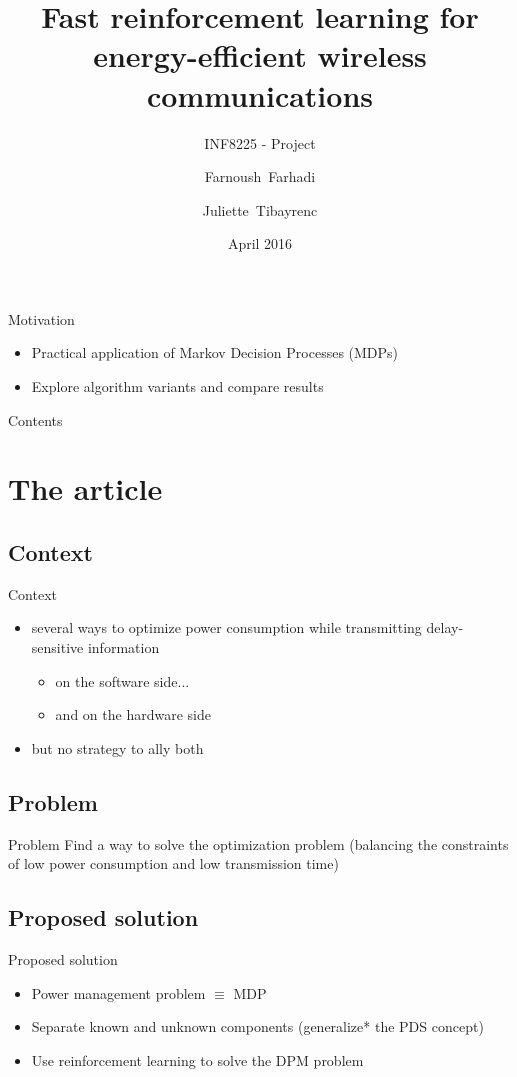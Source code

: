 \documentclass{beamer}
\title{Fast reinforcement learning for energy-efficient wireless communications}
\subtitle{INF8225 - Project}
\author{Farnoush~Farhadi \and Juliette~Tibayrenc}
\institute[Polytechnique Montreal] %
{
  Polytechnique Montreal
  }
\date{April 2016}
\begin{document}
\begin{frame}
  \titlepage
\end{frame}

\begin{frame}{Motivation}
\begin{itemize}
\item Practical application of Markov Decision Processes (MDPs)
\item Explore algorithm variants and compare results
\end{itemize}
\end{frame}

\begin{frame}{Contents}
  \tableofcontents
\end{frame}

\section{The article} 
\subsection{Context}
\begin{frame}{Context}
\begin{itemize}
\item several ways to optimize power consumption while transmitting delay-sensitive information
\begin{itemize}
\item on the software side...
\item and on the hardware side
\end{itemize}
\item but no strategy to ally both
\end{itemize}
\end{frame}

\subsection{Problem}
\begin{frame}{Problem}
Find a way to solve the optimization problem
(balancing the constraints of low power consumption and low transmission time)
\end{frame}

\subsection{Proposed solution}
\begin{frame}{Proposed solution}
\begin{itemize}
\item Power management problem $\equiv$ MDP
\item Separate known and unknown components (generalize* the PDS concept)
\item Use reinforcement learning to solve the DPM problem
\end{itemize}
\end{frame}
\end{document}
